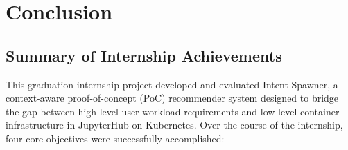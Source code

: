 \chapter{Conclusion}
\label{chap:conclusion}

\section{Summary of Internship Achievements}
\label{sec:summary_achievements}

This graduation internship project developed and evaluated Intent-Spawner, a context-aware proof-of-concept (PoC) recommender system designed to bridge the gap between high-level user workload requirements and low-level container infrastructure in JupyterHub on Kubernetes. Over the course of the internship, four core objectives were successfully accomplished:

